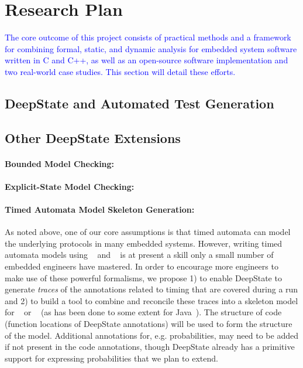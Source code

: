 \section{Research Plan}

%

\textcolor{blue}{The core outcome of this project consists of
  practical methods and a framework for combining formal, static, and dynamic analysis for embedded system software written in C and C++, as well as an open-source software implementation and two real-world case studies.  This section will detail these efforts.}

\subsection{DeepState and Automated Test Generation}
\label{sec:framac2deepstate}


\subsection{Other DeepState Extensions}

\paragraph{Bounded Model Checking:}


\paragraph{Explicit-State Model Checking:}


\paragraph{Timed Automata Model Skeleton Generation:}
As noted above, one of our core assumptions is that timed automata can
model the underlying protocols in many embedded systems.  However,
writing timed automata models using \uppaal~\cite{uppaal} and
\prism~\cite{KNP2011:CAV} is at present a skill only a small number of
embedded engineers have mastered.  In order to encourage more
engineers to make use of these powerful formalisms, we propose 1) to
enable DeepState to generate \emph{traces} of the annotations related
to timing that are covered during a run and 2) to build a tool to
combine and reconcile these traces into a skeleton model for \uppaal~\cite{uppaal} or
\prism~\cite{KNP2011:CAV} (as has been done to some extent for Java~\cite{liva2017extracting}).  The structure of code (function locations
of DeepState annotations) will be used to form the structure of the
model.  Additional annotations for, e.g. probabilities, may need to be
added if not present in the code annotations, though DeepState already
has a primitive support for expressing probabilities that we plan to extend.

